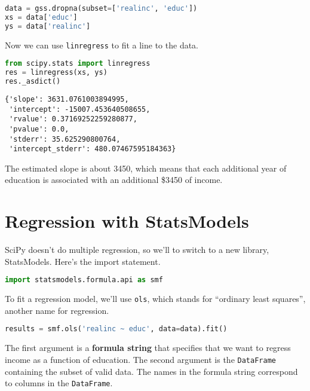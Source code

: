 \begin{lstlisting}[language=Python,style=source]
data = gss.dropna(subset=['realinc', 'educ'])
xs = data['educ']
ys = data['realinc']
\end{lstlisting}

Now we can use \passthrough{\lstinline!linregress!} to fit a line to the
data.

\begin{lstlisting}[language=Python,style=source]
from scipy.stats import linregress
res = linregress(xs, ys)
res._asdict()
\end{lstlisting}

\begin{lstlisting}[style=output]
{'slope': 3631.0761003894995,
 'intercept': -15007.453640508655,
 'rvalue': 0.37169252259280877,
 'pvalue': 0.0,
 'stderr': 35.625290800764,
 'intercept_stderr': 480.07467595184363}
\end{lstlisting}

The estimated slope is about 3450, which means that each additional year
of education is associated with an additional \$3450 of income.

\section{Regression with StatsModels}\label{regression-with-statsmodels}

SciPy doesn't do multiple regression, so we'll to switch to a new
library, StatsModels. Here's the import statement.

\begin{lstlisting}[language=Python,style=source]
import statsmodels.formula.api as smf
\end{lstlisting}

To fit a regression model, we'll use \passthrough{\lstinline!ols!},
which stands for ``ordinary least squares'', another name for
regression.


\begin{lstlisting}[language=Python,style=source]
results = smf.ols('realinc ~ educ', data=data).fit()
\end{lstlisting}

The first argument is a \textbf{formula string} that specifies that we
want to regress income as a function of education. The second argument
is the \passthrough{\lstinline!DataFrame!} containing the subset of
valid data. The names in the formula string correspond to columns in the
\passthrough{\lstinline!DataFrame!}.

